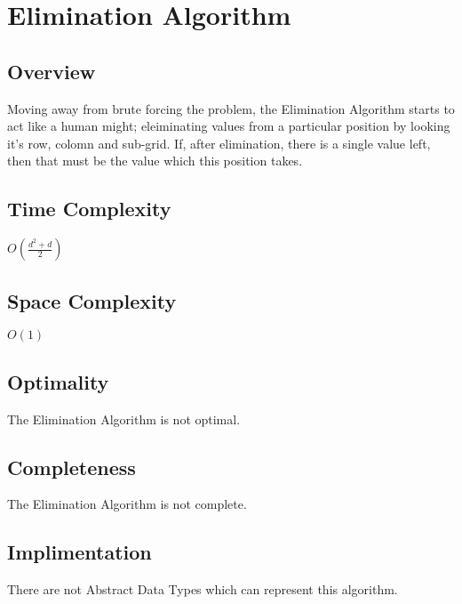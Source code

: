 \documentclass[10pt,letterpaper]{article}
\begin{document}
  \newpage  
  \section{Elimination Algorithm}
    \subsection{Overview}
      Moving away from brute forcing the problem, the Elimination Algorithm starts to act like a human might; eleiminating values from a particular position by looking it's row, colomn and sub-grid. If, after elimination, there is a single value left, then that must be the value which this position takes.
      
    \subsection{Time Complexity}
      \(O\left(\frac{d^2+d}{2}\right)\)
    
    \subsection{Space Complexity}
      \(O(1)\)
    
    \subsection{Optimality}
      The Elimination Algorithm is not optimal.
    
    \subsection{Completeness}
      The Elimination Algorithm is not complete.
    
    \subsection{Implimentation}
      There are not Abstract Data Types which can represent this algorithm.
    
    \newpage
\end{document}
